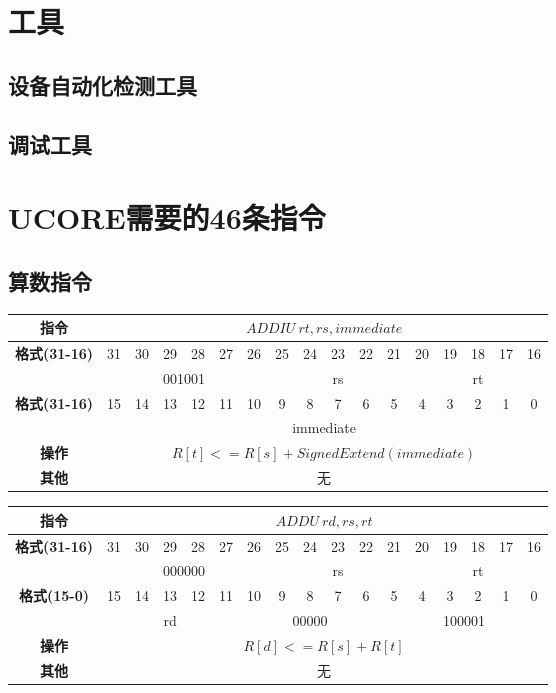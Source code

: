 \documentclass[11pt,utf8]{article}
\begin{document}
\section{工具}
\subsection{设备自动化检测工具}
\subsection{调试工具}

\section{UCORE需要的46条指令}
\subsection{算数指令}
\begin{center}
\begin{tabular}{|c|c|c|c|c|c|c|c|c|c|c|c|c|c|c|c|c|}
\hline
\textbf{指令} & \multicolumn{16}{c|}{$ADDIU~rt,rs,immediate$} \\
\hline
\multirow{2}{*}{\textbf{格式(31-16)}} & 31 & 30 & 29 & 28 & 27 & 26 & 25 & 24 & 23 & 22 & 21 & 20 & 19 & 18 & 17 & 16 \\ 
\cline{2-17}
& \multicolumn{6}{c|}{001001} & \multicolumn{5}{c|}{rs} & \multicolumn{5}{c|}{rt}\\
\hline
\multirow{2}{*}{\textbf{格式(31-16)}} & 15 & 14 & 13 & 12 & 11 & 10 & 9 & 8 & 7 & 6 & 5 & 4 & 3 & 2 & 1 & 0 \\
\cline{2-17}
& \multicolumn{16}{c|}{immediate} \\
\hline
\textbf{操作} & \multicolumn{16}{c|}{$R[t]<=R[s] + SignedExtend(immediate)$} \\
\hline
\textbf{其他} & \multicolumn{16}{c|}{无} \\
\hline
\end{tabular}
\end{center}

\begin{center}
\begin{tabular}{|c|c|c|c|c|c|c|c|c|c|c|c|c|c|c|c|c|}
\hline
\textbf{指令} & \multicolumn{16}{c|}{$ADDU~rd,rs,rt$} \\
\hline
\multirow{2}{*}{\textbf{格式(31-16)}} & 31 & 30 & 29 & 28 & 27 & 26 & 25 & 24 & 23 & 22 & 21 & 20 & 19 & 18 & 17 & 16 \\ 
\cline{2-17}
& \multicolumn{6}{c|}{000000} & \multicolumn{5}{c|}{rs} & \multicolumn{5}{c|}{rt}\\
\hline
\multirow{2}{*}{\textbf{格式(15-0)}} & 15 & 14 & 13 & 12 & 11 & 10 & 9 & 8 & 7 & 6 & 5 & 4 & 3 & 2 & 1 & 0 \\
\cline{2-17}
& \multicolumn{5}{c|}{rd} & \multicolumn{5}{c|}{00000} & \multicolumn{6}{c|}{100001}  \\
\hline
\textbf{操作} & \multicolumn{16}{c|}{$R[d]<=R[s]+R[t]$} \\
\hline
\textbf{其他} & \multicolumn{16}{c|}{无} \\
\hline
\end{tabular}
\end{center}
\end{document}
